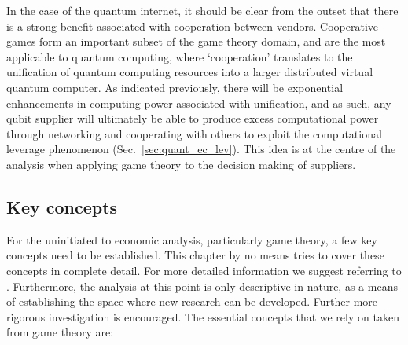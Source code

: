 In the case of the quantum internet, it should be clear from the outset that there is a strong benefit associated with cooperation between vendors. Cooperative games form an important subset of the game theory domain, and are the most applicable to quantum computing, where `cooperation' translates to the unification of quantum computing resources into a larger distributed virtual quantum computer. As indicated previously, there will be exponential enhancements in computing power associated with unification, and as such, any qubit supplier will ultimately be able to produce excess computational power through networking and cooperating with others to exploit the computational leverage phenomenon (Sec.~\ref{sec:quant_ec_lev}). This idea is at the centre of the analysis when applying game theory to the decision making of suppliers.

\subsection{Key concepts}

For the uninitiated to economic analysis, particularly game theory, a few key concepts need to be established. This chapter by no means tries to cover these concepts in complete detail. For more detailed information we suggest referring to \cite{bib:Sugden04, bib:Bacharach76, bib:Straffin93}. Furthermore, the analysis at this point is only descriptive in nature, as a means of establishing the space where new research can be developed. Further more rigorous investigation is encouraged. The essential concepts that we rely on taken from game theory are:

